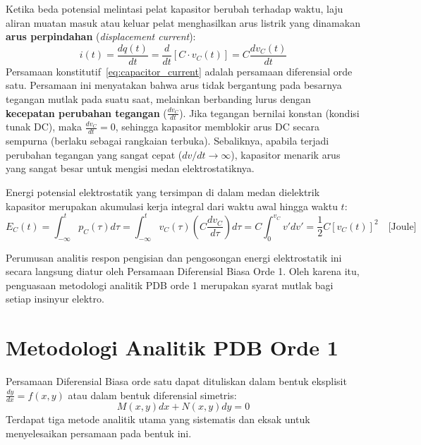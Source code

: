 \documentclass[11pt,a4paper]{article}
\theoremstyle{definition}
\begin{document}
Ketika beda potensial melintasi pelat kapasitor berubah terhadap waktu, laju aliran muatan masuk atau keluar pelat menghasilkan arus listrik yang dinamakan \textbf{arus perpindahan} (\textit{displacement current}):
\begin{equation}
    i(t) = \frac{dq(t)}{dt} = \frac{d}{dt}\left[ C \cdot v_C(t) \right] = C \frac{dv_C(t)}{dt}
    \label{eq:capacitor_current}
\end{equation}
Persamaan konstitutif~\eqref{eq:capacitor_current} adalah persamaan diferensial orde satu. Persamaan ini menyatakan bahwa arus tidak bergantung pada besarnya tegangan mutlak pada suatu saat, melainkan berbanding lurus dengan \textbf{kecepatan perubahan tegangan} ($\frac{dv_C}{dt}$). Jika tegangan bernilai konstan (kondisi tunak DC), maka $\frac{dv_C}{dt} = 0$, sehingga kapasitor memblokir arus DC secara sempurna (berlaku sebagai rangkaian terbuka). Sebaliknya, apabila terjadi perubahan tegangan yang sangat cepat ($dv/dt \to \infty$), kapasitor menarik arus yang sangat besar untuk mengisi medan elektrostatiknya.

Energi potensial elektrostatik yang tersimpan di dalam medan dielektrik kapasitor merupakan akumulasi kerja integral dari waktu awal hingga waktu $t$:
\begin{equation}
    E_C(t) = \int_{-\infty}^t p_C(\tau) d\tau = \int_{-\infty}^t v_C(\tau) \left( C \frac{dv_C}{d\tau} \right) d\tau = C \int_0^{v_C} v' dv' = \frac{1}{2} C \left[ v_C(t) \right]^2 \quad \text{[Joule]}
    \label{eq:energy_capacitor}
\end{equation}

Perumusan analitis respon pengisian dan pengosongan energi elektrostatik ini secara langsung diatur oleh Persamaan Diferensial Biasa Orde 1. Oleh karena itu, penguasaan metodologi analitik PDB orde 1 merupakan syarat mutlak bagi setiap insinyur elektro.

\section{Metodologi Analitik PDB Orde 1}

Persamaan Diferensial Biasa orde satu dapat dituliskan dalam bentuk eksplisit $\frac{dy}{dx} = f(x,y)$ atau dalam bentuk diferensial simetris:
\begin{equation}
    M(x,y) dx + N(x,y) dy = 0
    \label{eq:differential_form}
\end{equation}
Terdapat tiga metode analitik utama yang sistematis dan eksak untuk menyelesaikan persamaan pada bentuk ini.
\end{document}

